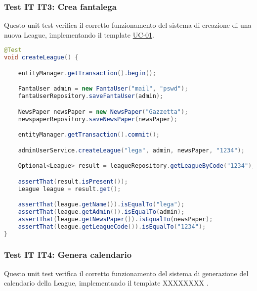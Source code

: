 
\subsubsection{Test IT IT3: Crea fantalega} \label{IT3}

Questo unit test verifica il corretto funzionamento del sistema di creazione di una nuova League,
implementando il template \hyperref[UC-01]{UC-01}.

\begin{lstlisting}[language=Java]
@Test
void createLeague() {

	entityManager.getTransaction().begin();

	FantaUser admin = new FantaUser("mail", "pswd");
	fantaUserRepository.saveFantaUser(admin);

	NewsPaper newsPaper = new NewsPaper("Gazzetta");
	newspaperRepository.saveNewsPaper(newsPaper);

	entityManager.getTransaction().commit();

	adminUserService.createLeague("lega", admin, newsPaper, "1234");

    Optional<League> result = leagueRepository.getLeagueByCode("1234");

	assertThat(result.isPresent());
	League league = result.get();

	assertThat(league.getName()).isEqualTo("lega");
	assertThat(league.getAdmin()).isEqualTo(admin);
	assertThat(league.getNewsPaper()).isEqualTo(newsPaper);
	assertThat(league.getLeagueCode()).isEqualTo("1234");
}
\end{lstlisting}


\subsubsection{Test IT IT4: Genera calendario} \label{IT4}

Questo unit test verifica il corretto funzionamento del sistema di generazione del calendario della League,
implementando il template XXXXXXXX .

